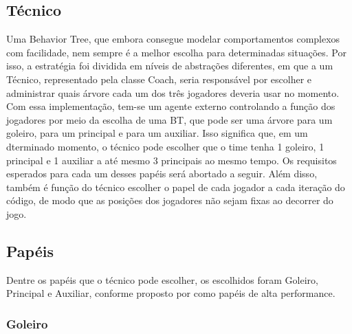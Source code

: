 \documentclass[a4paper,12pt]{article}
\begin{document}
\subsection{Técnico}

Uma Behavior Tree, que embora consegue modelar comportamentos complexos com facilidade, nem sempre é a melhor escolha para determinadas situações. Por isso, a estratégia foi dividida em níveis de abstrações diferentes, em que a um Técnico, representado pela classe Coach, seria responsável por escolher e administrar quais árvore cada um dos três jogadores deveria usar no momento.
Com essa implementação, tem-se um agente externo controlando a função dos jogadores por meio da escolha de uma BT, que pode ser uma árvore para um goleiro, para um principal e para um auxiliar. Isso significa que, em um dterminado momento, o técnico pode escolher que o time tenha 1 goleiro, 1 principal e 1 auxiliar a até mesmo 3 principais ao mesmo tempo. Os requisitos esperados para cada um desses papéis será abortado a seguir. Além disso, também é função do técnico escolher o papel de cada jogador a cada iteração do código, de modo que as posições dos jogadores não sejam fixas ao decorrer do jogo.

\subsection{Papéis}

Dentre os papéis que o técnico pode escolher, os escolhidos foram Goleiro, Principal e Auxiliar, conforme  proposto por \cite{egly2005decision} como papéis de alta performance.

\subsubsection{Goleiro} 
\end{document}
